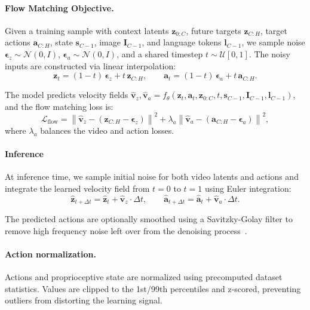 \paragraph{Flow Matching Objective.}

Given a training sample with context latents $\mathbf{z}_{0:C}$, future targets $\mathbf{z}_{C:H}$, target actions $\mathbf{a}_{C:H}$, state $\mathbf{s}_{C-1}$, image $\mathbf{I}_{C-1}$, and language tokens $\mathbf{l}_{C-1}$, we sample noise $\boldsymbol{\epsilon}_z \sim \mathcal{N}(0, I)$, $\boldsymbol{\epsilon}_a \sim \mathcal{N}(0, I)$, and a shared timestep $t \sim \mathcal{U}[0, 1]$.
The noisy inputs are constructed via linear interpolation:
\begin{equation}
    \mathbf{z}_t = (1 - t)\,\boldsymbol{\epsilon}_z + t\,\mathbf{z}_{C:H}, \qquad \mathbf{a}_t = (1 - t)\,\boldsymbol{\epsilon}_a + t\,\mathbf{a}_{C:H}.
\end{equation}

The model predicts velocity fields $\hat{\mathbf{v}}_z, \hat{\mathbf{v}}_a = f_\theta(\mathbf{z}_t, \mathbf{a}_t, \mathbf{z}_{0:C}, t, \mathbf{s}_{C-1}, \mathbf{I}_{C-1}, \mathbf{l}_{C-1})$, and the flow matching loss is:
\begin{equation}
    \mathcal{L}_{\text{flow}} = \left\| \hat{\mathbf{v}}_z - (\mathbf{z}_{C:H} - \boldsymbol{\epsilon}_z) \right\|^2 + \lambda_a \left\| \hat{\mathbf{v}}_a - (\mathbf{a}_{C:H} - \boldsymbol{\epsilon}_a) \right\|^2,
\end{equation}
where $\lambda_a$ balances the video and action losses.

\paragraph{Inference}

At inference time, we sample initial noise for both video latents and actions and integrate the learned velocity field from $t = 0$ to $t = 1$ using Euler integration:
\begin{equation}
    \hat{\mathbf{z}}_{t+\Delta t} = \hat{\mathbf{z}}_t + \hat{\mathbf{v}}_z \cdot \Delta t, \qquad \hat{\mathbf{a}}_{t+\Delta t} = \hat{\mathbf{a}}_t + \hat{\mathbf{v}}_a \cdot \Delta t.
\end{equation}

The predicted actions are optionally smoothed using a Savitzky-Golay filter to remove high frequency noise left over from the denoising process~\cite{DreamZero}.

\paragraph{Action normalization.}
Actions and proprioceptive state are normalized using precomputed dataset statistics. Values are clipped to the 1st/99th percentiles and z-scored, preventing outliers from distorting the learning signal.

